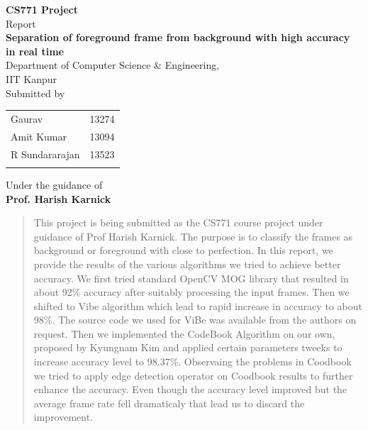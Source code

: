 \documentclass[12pt,a4paper]{article}
\begin{document}

\begin{titlepage}

\begin{center}

\textup{\small {\bf CS771 Project} \\ Report}\\[0.2in]

\Large \textbf {Separation of foreground frame from background with  high
accuracy in real time}\\[0.5in]
{Department of Computer Science \& Engineering, \\IIT Kanpur }\\[0.2in]

\normalsize Submitted by \\
\begin{table}[h]
\centering
\begin{tabular}{lr} 
Gaurav & 13274 \\
Amit Kumar& 13094 \\
R Sundararajan& 13523\\ \\ 
\end{tabular}
\end{table}

\vspace{.1in}
Under the guidance of\\
{\textbf{Prof. Harish Karnick}}\\[0.2in]

\end{center}
\end{titlepage}
\begin{abstract}
This project is being submitted as the CS771 course project under guidance of Prof Harish Karnick. 
The purpose is to classify the frames as background or foreground with close to perfection.
In this report, we provide the results of the various algorithms we tried to achieve better accuracy.
We first tried standard OpenCV MOG library that resulted in about 92\% accuracy after suitably processing the input frames. Then we shifted to Vibe algorithm which lead to rapid increase in accuracy to about 98\%. The source code we used for ViBe was available from the authors on request. Then we implemented the CodeBook Algorithm on our own, proposed by Kyungnam Kim and applied certain parameters tweeks to increase accuracy level to 98.37\%.
Observaing the problems in Coodbook we tried to apply edge detection operator on Coodbook results to further enhance the accuracy. Even though the accuracy level improved but the average frame rate fell dramaticaly that lead us to discard the improvement. 
\end{abstract} 
\end{document}
